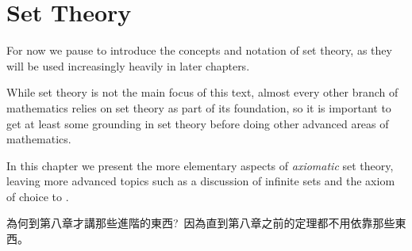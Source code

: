 \chapter{Set Theory} \label{ch3}

For now we pause to introduce the concepts and notation of set theory, as they will be used increasingly heavily in
later chapters.

While set theory is not the main focus of this text, almost every other branch of mathematics relies on set theory as part of its foundation, so it is important to get at least some grounding in set theory before doing other advanced areas of mathematics.

In this chapter we present the more elementary aspects of \emph{axiomatic} set theory, leaving more advanced topics such as a discussion of infinite sets and the axiom of choice to
.

\begin{note}
為何到第八章才講那些進階的東西?\ 因為直到第八章之前的定理都不用依靠那些東西。
\end{note}




